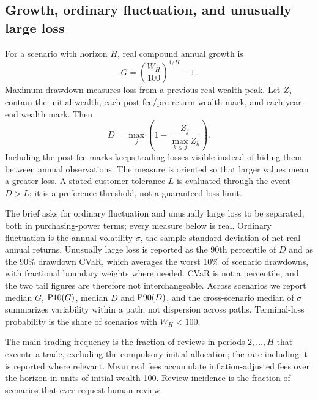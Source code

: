 \subsection{Growth, ordinary fluctuation, and unusually large loss}
For a scenario with horizon $H$, real compound annual growth is
\begin{equation}
G=\left(\frac{W_H}{100}\right)^{1/H}-1.
\end{equation}
Maximum drawdown measures loss from a previous real-wealth peak. Let $Z_j$ contain the initial wealth, each post-fee/pre-return wealth mark, and each year-end wealth mark. Then
\begin{equation}
D=\max_j\left(1-\frac{Z_j}{\max_{k\leq j}Z_k}\right).
\label{eq:drawdown}
\end{equation}
Including the post-fee marks keeps trading losses visible instead of hiding them between annual observations. The measure is oriented so that larger values mean a greater loss. A stated customer tolerance $L$ is evaluated through the event $D>L$; it is a preference threshold, not a guaranteed loss limit.

The brief asks for ordinary fluctuation and unusually large loss to be separated, both in purchasing-power terms; every measure below is real. Ordinary fluctuation is the annual volatility $\sigma$, the sample standard deviation of net real annual returns. Unusually large loss is reported as the 90th percentile of $D$ and as the 90\% drawdown CVaR, which averages the worst 10\% of scenario drawdowns, with fractional boundary weights where needed. CVaR is not a percentile, and the two tail figures are therefore not interchangeable. Across scenarios we report median $G$, $\operatorname{P10}(G)$, median $D$ and $\operatorname{P90}(D)$, and the cross-scenario median of $\sigma$ summarizes variability within a path, not dispersion across paths. Terminal-loss probability is the share of scenarios with $W_H<100$.

The main trading frequency is the fraction of reviews in periods $2,\ldots,H$ that execute a trade, excluding the compulsory initial allocation; the rate including it is reported where relevant. Mean real fees accumulate inflation-adjusted fees over the horizon in units of initial wealth 100. Review incidence is the fraction of scenarios that ever request human review.

